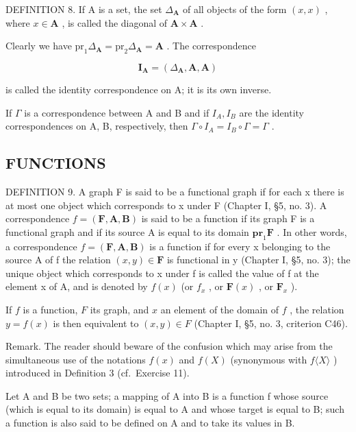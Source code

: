 DEFINITION 8. If A is a set, the set \(\Delta_{\mathbf{A}}\) of all objects of the form \((x, x)\) , where \(x \in \mathbf{A}\) , is called the diagonal of \(\mathbf{A} \times \mathbf{A}\) .

Clearly we have \(\mathrm{pr}_1\Delta_{\mathbf{A}} = \mathrm{pr}_2\Delta_{\mathbf{A}} = \mathbf{A}\) . The correspondence

\[
\mathbf {I} _ {\mathbf {A}} = (\Delta_ {\mathbf {A}}, \mathbf {A}, \mathbf {A})
\]

is called the identity correspondence on A; it is its own inverse.

If \(\Gamma\) is a correspondence between A and B and if \(I_{A}, I_{B}\) are the identity correspondences on A, B, respectively, then \(\Gamma \circ I_{A} = I_{B} \circ \Gamma = \Gamma\) .

\subsection{FUNCTIONS}

DEFINITION 9. A graph F is said to be a functional graph if for each x there is at most one object which corresponds to x under F (Chapter I, §5, no. 3). A correspondence \(f = (\mathbf{F}, \mathbf{A}, \mathbf{B})\) is said to be a function if its graph F is a functional graph and if its source A is equal to its domain \(\mathbf{pr}_1\mathbf{F}\) . In other words, a correspondence \(f = (\mathbf{F}, \mathbf{A}, \mathbf{B})\) is a function if for every x belonging to the source A of f the relation \((x, y) \in \mathbf{F}\) is functional in y (Chapter I, §5, no. 3); the unique object which corresponds to x under f is called the value of f at the element x of A, and is denoted by \(f(x)\) (or \(f_x\) , or \(\mathbf{F}(x)\) , or \(\mathbf{F}_x\) ).

If \(f\) is a function, \(F\) its graph, and \(x\) an element of the domain of \(f\) , the relation \(y = f(x)\) is then equivalent to \((x, y) \in F\) (Chapter I, §5, no. 3, criterion C46).

Remark. The reader should beware of the confusion which may arise from the simultaneous use of the notations \(f(x)\) and \(f(X)\) (synonymous with \(f\langle X\rangle\) ) introduced in Definition 3 (cf.~Exercise 11).

Let A and B be two sets; a mapping of A into B is a function f whose source (which is equal to its domain) is equal to A and whose target is equal to B; such a function is also said to be defined on A and to take its values in B.

